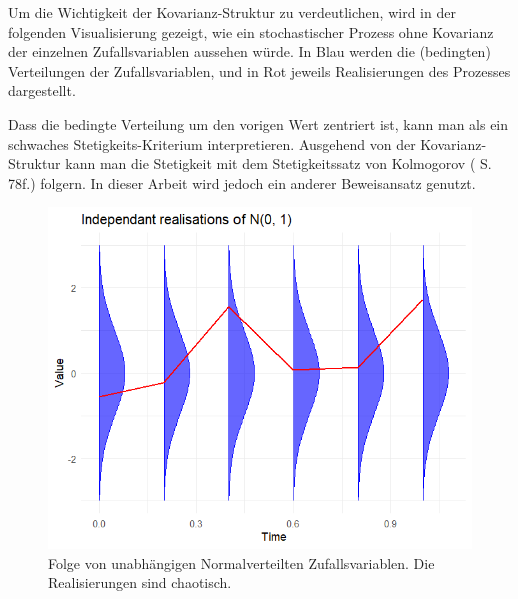 \begin{bem}
Um die Wichtigkeit der Kovarianz-Struktur zu verdeutlichen, wird in der folgenden Visualisierung gezeigt, wie ein
stochastischer Prozess ohne Kovarianz der einzelnen Zufallsvariablen aussehen würde.
In Blau werden die (bedingten) Verteilungen der Zufallsvariablen, und in Rot jeweils Realisierungen des Prozesses dargestellt.

Dass die bedingte Verteilung um den vorigen Wert zentriert ist, kann man als ein schwaches Stetigkeits-Kriterium interpretieren.
Ausgehend von der Kovarianz-Struktur kann man die Stetigkeit mit dem Stetigkeitssatz von Kolmogorov (\cite{behrends} S. 78f.) folgern.
In dieser Arbeit wird jedoch ein anderer Beweisansatz genutzt.

\begin{figure}[H]
  \centering
  \begin{minipage}{0.48\textwidth}
    \includegraphics[width=\textwidth]{images/bb_without_cov.png}
    \caption{Folge von unabhängigen Normalverteilten Zufallsvariablen. Die Realisierungen sind chaotisch.}
    \label{fig:bb_without_cov}
  \end{minipage}\hfill
  \begin{minipage}{0.48\textwidth}

\end{minipage}
\end{figure}
\end{bem}
